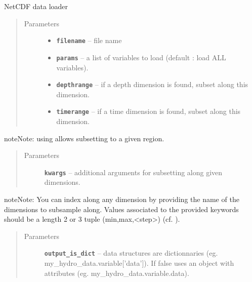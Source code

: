 \documentclass[letterpaper,10pt,english]{sphinxmanual}
\begin{document}
\begin{fulllineitems}
\begin{fulllineitems}
\label{altimetry.tools.nctools:altimetry.tools.nctools.nc.load}
NetCDF data loader
\begin{quote}\begin{description}
\item[{Parameters}] \leavevmode\begin{itemize}
\item {} 
\textbf{\texttt{filename}} -- file name

\item {} 
\textbf{\texttt{params}} -- a list of variables to load (default : load ALL variables).

\item {} 
\textbf{\texttt{depthrange}} -- if a depth dimension is found, subset along this dimension.

\item {} 
\textbf{\texttt{timerange}} -- if a time dimension is found, subset along this dimension.

\end{itemize}

\end{description}\end{quote}

\begin{notice}{note}{Note:}
using  allows subsetting to a given region.
\end{notice}
\begin{quote}\begin{description}
\item[{Parameters}] \leavevmode
\textbf{\texttt{kwargs}} -- additional arguments for subsetting along given dimensions.

\end{description}\end{quote}

\begin{notice}{note}{Note:}
You can index along any dimension by providing the name of the dimensions to subsample along. Values associated to the provided keywords should be a length 2 or 3 tuple (min,max,\textless{}step\textgreater{}) (cf. ).
\end{notice}
\begin{quote}\begin{description}
\item[{Parameters}] \leavevmode
\textbf{\texttt{output\_is\_dict}} -- data structures are dictionnaries (eg. my\_hydro\_data.variable{[}'data'{]}). If false uses an object with attributes (eg. my\_hydro\_data.variable.data).


\end{description}
\end{quote}
\end{fulllineitems}
\end{fulllineitems}
\end{document}
